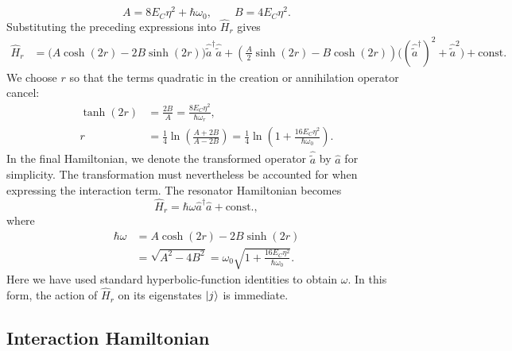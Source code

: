 \documentclass[11pt,a4paper]{article}
\numberwithin{equation}{section}
\begin{document}
\begin{equation}
  A=8E_C\eta^2+\hbar\omega_0,
  \qquad B=4E_C\eta^2.
\end{equation}
Substituting the preceding expressions into $\hat H_r$ gives
\begin{equation}
  \begin{aligned}
    \hat H_r
      &=\bigl(A\cosh(2r)-2B\sinh(2r)\bigr)
        \hat{\tilde a}^\dagger\hat{\tilde a}+\left(\frac A2\sinh(2r)-B\cosh(2r)\right) \bigl((\hat{\tilde a}^\dagger)^2+\hat{\tilde a}^2\bigr)+\text{const.}
  \end{aligned}
\end{equation}
We choose $r$ so that the terms quadratic in the creation or annihilation
operator cancel:
\begin{equation}
  \begin{aligned}
    \tanh(2r)
      &=\frac{2B}{A}=\frac{8E_C\eta^2}{\hbar\omega_r},\\[3pt]
    r 
      &=\frac14\ln\left(\frac{A+2B}{A-2B}\right)
      =\frac14\ln\left(1+\frac{16E_C\eta^2}{\hbar\omega_0}\right).
  \end{aligned}
\end{equation}
In the final Hamiltonian, we denote the transformed operator
$\hat{\tilde a}$ by $\hat a$ for simplicity. The transformation must
nevertheless be accounted for when expressing the interaction term.
The resonator Hamiltonian becomes
\begin{equation}
  \hat H_r=\hbar\omega\hat a^\dagger\hat a+\text{const.},
\end{equation}
where
\begin{equation}
  \begin{aligned}
    \hbar\omega
      &=A\cosh(2r)-2B\sinh(2r)\\
      &=\sqrt{A^2-4B^2}
       =\omega_0\sqrt{1+\frac{16E_C\eta^2}{\hbar\omega_0}}.
  \end{aligned}
\end{equation}
Here we have used standard hyperbolic-function identities to obtain
$\omega$. In this form, the action of $\hat H_r$ on its eigenstates
$\ket{j}$ is immediate.

\subsection{Interaction Hamiltonian}
\end{document}
